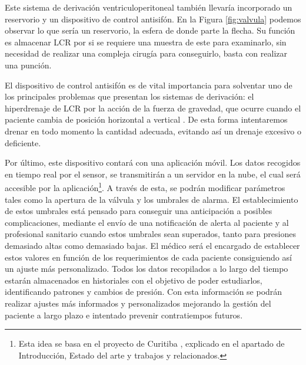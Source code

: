 Este sistema de derivación ventriculoperitoneal también llevaría incorporado un reservorio y un dispositivo de control antisifón. En la Figura \ref{fig:valvula} podemos observar lo que sería un reservorio, la esfera de donde parte la flecha. Su función es almacenar LCR por si se requiere una muestra de este para examinarlo, sin necesidad de realizar una compleja cirugía para conseguirlo, basta con realizar una punción.

El dispositivo de control antisifón es de vital importancia para solventar uno de los principales problemas que presentan los sistemas de derivación: el hiperdrenaje de LCR por la acción de la fuerza de gravedad, que ocurre cuando el paciente cambia de posición horizontal a vertical \cite{derivacion}. De esta forma intentaremos drenar en todo momento la cantidad adecuada, evitando así un drenaje excesivo o deficiente. 

Por último, este dispositivo contará con una aplicación móvil. Los datos recogidos en tiempo real por el sensor, se transmitirán a un servidor en la nube, el cual será accesible por la aplicación\footnote{Esta idea se basa en el proyecto de Curitiba \cite{curitibaa}, explicado en el apartado de Introducción, Estado del arte y trabajos y relacionados.}. A través de esta, se podrán modificar parámetros tales como la apertura de la válvula y los umbrales de alarma. El establecimiento de estos umbrales está pensado para conseguir una anticipación a posibles complicaciones, mediante el envío de una notificación de alerta al paciente y al profesional sanitario cuando estos umbrales sean superados, tanto para presiones demasiado altas como demasiado bajas. El médico será el encargado de establecer estos valores en función de los requerimientos de cada paciente consiguiendo así un ajuste más personalizado. Todos los datos recopilados a lo largo del tiempo estarán almacenados en historiales con el objetivo de poder estudiarlos, identificando patrones y cambios de presión. Con esta información se podrán realizar ajustes más informados y personalizados mejorando la gestión del paciente a largo plazo e intentado prevenir contratiempos futuros.








